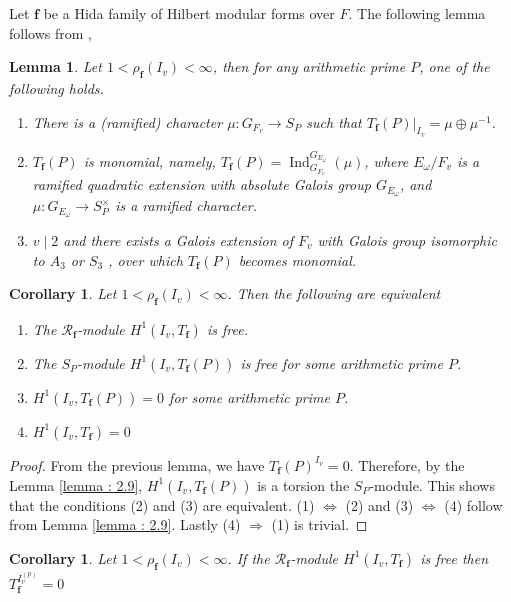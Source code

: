 \documentclass[10pt]{amsart}
\numberwithin{equation}{section}
\newtheorem{cor}[thm]{Corollary}
\newtheorem{lemma}[thm]{Lemma}
\theoremstyle{definition}
\theoremstyle{remark} %
\newcommand{\Ind}{\operatorname{Ind}}
\newcommand{\f}{\mathbf{f}}
\newcommand{\R}{\mathcal{R}}
\begin{document}
	Let $ \f $ be a Hida family of Hilbert modular forms over $ F $. The following lemma follows from \cite[.4, Proposition 12.7.14.2]{Nek06},
	\begin{lemma}
		\label{lemma : 2.13}
		Let $ 1 < \rho_{\f}(I_{v}) < \infty$, then for any arithmetic prime $ P $, one of the following holds.
		\begin{enumerate}
			\item There is a (ramiﬁed) character $\mu \colon G_{F_v} \rightarrow S_P$ such that $T_\f(P)|_{I_v} =  \mu \oplus \mu^{-1}$.
			\item $T_\f(P )$ is monomial, namely, $T_\f(P ) = \Ind^{G_{E_\omega}}_{G_{F_v}}(\mu)$, where $E_{\omega} /F_v$ is a ramiﬁed quadratic extension with absolute Galois group $ G_{E_\omega} $, and $ \mu \colon G_{E_\omega} \rightarrow S_{P}^{\times} $ is a ramified character.
			\item $v \mid 2$ and there exists a Galois extension of $F_v$ with Galois group isomorphic to $A_3$ or $S_3$ , over which $ T_\f(P ) $ becomes monomial.
		\end{enumerate} 
	\end{lemma}
	\begin{cor}
		\label{cor : 2.14}
		Let $ 1 < \rho_{\f}(I_{v}) < \infty$. Then the following are equivalent
		\begin{enumerate}
			\item The $ \R_{\f} $-module $ H^1(I_v, T_\f) $ is free.
			\item The $ S_P $-module $ H^1(I_v, T_\f(P)) $ is free for some arithmetic prime $ P $.
			\item $ H^1(I_v, T_\f(P)) =0 $ for some arithmetic prime $ P $.
			\item $ H^1(I_v, T_\f) =0$
		\end{enumerate}
	\end{cor}
	\begin{proof}
		From the previous lemma, we have $ T_\f(P)^{I_v}= 0 $. Therefore, by the Lemma \ref{lemma : 2.9}, $ H^1(I_v, T_\f(P)) $ is a torsion the $ S_P $-module. This shows that the conditions (2) and (3) are equivalent. (1) $\Leftrightarrow$ (2) and (3) $\Leftrightarrow$ (4) follow from Lemma \ref{lemma : 2.9}. Lastly (4) $ \Rightarrow $ (1) is trivial.
	\end{proof}
	\begin{cor}
		Let $ 1 < \rho_{\f}(I_{v}) < \infty$. If the $ \R_{\f} $-module $ H^1(I_v, T_\f) $ is free then $ T_\f^{I_v^{(p)}}= 0 $
	\end{cor}
\end{document}
